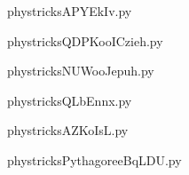     \clearpage
    


    \newcommand{\CaptionFigAPYEkIv}{<+Type your caption here+>}
    \begin{center}
        
    \end{center}
    phystricksAPYEkIv.py

    

    \clearpage
    


    \newcommand{\CaptionFigQDPKooICzieh}{<+Type your caption here+>}
    \begin{center}
        
    \end{center}
    phystricksQDPKooICzieh.py

    

    \clearpage
    


    \newcommand{\CaptionFigNUWooJepuh}{<+Type your caption here+>}
    \begin{center}
        
    \end{center}
    phystricksNUWooJepuh.py

    

    \clearpage
    


    \newcommand{\CaptionFigQLbEnnx}{<+Type your caption here+>}
    \begin{center}
        
    \end{center}
    phystricksQLbEnnx.py

    

    \clearpage
    


    \newcommand{\CaptionFigAZKoIsL}{<+Type your caption here+>}
    \begin{center}
        
    \end{center}
    phystricksAZKoIsL.py

    

    \clearpage
    


    \newcommand{\CaptionFigPythagoreeBqLDU}{<+Type your caption here+>}
    \begin{center}
        
    \end{center}
    phystricksPythagoreeBqLDU.py

